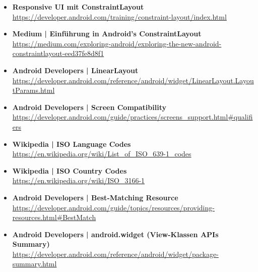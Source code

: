 \documentclass[a4paper]{article}
\begin{document}
{\begin{itemize}
		\item \textbf{Responsive UI mit ConstraintLayout}\\
		\href{https://developer.android.com/training/constraint-layout/index.html}
		{https://developer.android.com/training/constraint-layout/index.html}
		
		\item \textbf{Medium | Einführung in Android's ConstraintLayout}\\
		\href{https://medium.com/exploring-android/exploring-the-new-android-constraintlayout-eed37fe8d8f1}
		{https://medium.com/exploring-android/exploring-the-new-android-constraintlayout-eed37fe8d8f1}
		
		\item \textbf{Android Developers | LinearLayout}\\
		\href{https://developer.android.com/reference/android/widget/LinearLayout.LayoutParams.html}
		{https://developer.android.com/reference/android/widget/LinearLayout.LayoutParams.html}
		
		\item \textbf{Android Developers | Screen Compatibility}\\
		\href{https://developer.android.com/guide/practices/screens_support.html#qualifiers}
		{https://developer.android.com/guide/practices/screens\_support.html\#qualifiers}
		
		\item \textbf{Wikipedia | ISO Language Codes}\\
		\href{https://en.wikipedia.org/wiki/List_of_ISO_639-1_codes}
		{https://en.wikipedia.org/wiki/List\_of\_ISO\_639-1\_codes}
		
		\item \textbf{Wikipedia | ISO Country Codes}\\
		\href{https://en.wikipedia.org/wiki/ISO_3166-1}
		{https://en.wikipedia.org/wiki/ISO\_3166-1}
		
		\item \textbf{Android Developers | Best-Matching Resource}\\
		\href{https://developer.android.com/guide/topics/resources/providing-resources.html#BestMatch}
		{https://developer.android.com/guide/topics/resources/providing-resources.html\#BestMatch}
		
		\item \textbf{Android Developers | android.widget (View-Klassen APIs Summary)}\\
		\href{https://developer.android.com/reference/android/widget/package-summary.html}
		{https://developer.android.com/reference/android/widget/package-summary.html}
		

\end{itemize}}
\end{document}
